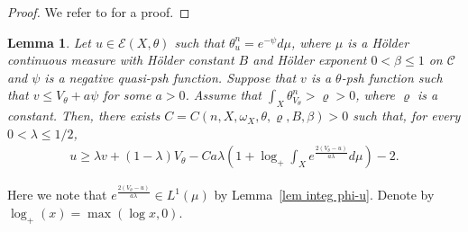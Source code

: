 \documentclass[a4paper,11pt]{amsart}
\numberwithin{equation}{section}
\newtheorem{lemma}[theorem]{Lemma}
\theoremstyle{definition}
\begin{document}
\begin{proof}
     We refer to \cite[pages 614–615]{eyssidieux2009singular} for a proof.
\end{proof}
\begin{lemma}\label{lem DL17}
	Let $u\in \mathcal{E} (X, \theta)$ such that $\theta_u^n=e^{-\psi}d\mu$, where $\mu$ is a H\"older continuous measure with H\"older constant $B$ and H\"older exponent $0<\beta\leq 1$ on $\mathcal{C}$
	and $\psi$ is a negative quasi-psh function. Suppose that $v$ is a $\theta$-psh function such that
	$v\leq V_{\theta}+a\psi$ for some $a>0$. Assume that $\int_X\theta_{V_{\theta}}^n>\varrho>0$, where $\varrho$ is a constant. Then,  there exists $C=C(n, X, \omega_X, \theta, \varrho, B, \beta)>0$ such that,
	for every $0<\lambda\leq  1/2$,
	\begin{align*}
		u\geq  \lambda v+(1-\lambda) V_{\theta}-C a\lambda \left(1+\log_+\int_Xe^{\frac{2(V_\theta-u)}{a\lambda}}d\mu\right)-2.
	\end{align*}
\end{lemma}
Here we note that $e^{\frac{2(V_{\theta}-u)}{a\lambda}} \in L^1(\mu)$ by Lemma~\ref{lem integ phi-u}. Denote by $\log_+(x)=\max(\log x,0)$.
\end{document}
